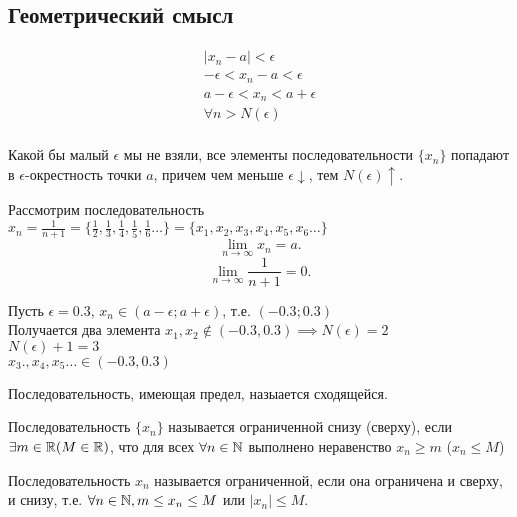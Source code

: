 \subsection{Геометрический смысл}
\begin{align*}
|x_{n} - a| < \epsilon \\
- \epsilon< x_{n} - a < \epsilon \\
a - \epsilon < x_{n} < a + \epsilon \\
\forall n > N(\epsilon) \\
\end{align*}

Какой бы малый $\epsilon$ мы не взяли, все элементы последовательности $\{x_{n}\}$ попадают в $\epsilon$-окрестность точки $a$, причем чем меньше $\epsilon \downarrow$, тем  $N(\epsilon) \uparrow$.

\begin{eg}
  Рассмотрим последовательность $x_{n} = \frac{1}{n+1} = \{ \frac{1}{2}, \frac{1}{3}, \frac{1}{4}, \frac{1}{5}, \frac{1}{6}\ldots \} = \{x_1, x_2, x_3, x_4, x_5, x_6\ldots\} $
  \[
  \lim_{n \to \infty} x_{n} = a
  .\] 
  \[
  \lim_{n \to \infty} \frac{1}{n+1} = 0
  .\] 
\end{eg}
\begin{eg}
  Пусть $\epsilon = 0.3$, $x_{n}\in (a-\epsilon; a+\epsilon)$, т.е. $(-0.3; 0.3)$ \\
  Получается два элемента $x_1, x_2 \not\in (-0.3, 0.3) \implies N(\epsilon) = 2$ \\
  $N(\epsilon) + 1 = 3$ \\
  $x_3., x_4, x_5 \ldots \in (-0.3, 0.3)$ \\
\end{eg}

\begin{definition}
  Последовательность, имеющая предел, назыается сходящейся.
\end{definition}

\begin{definition}
  Последовательность $\{x_{n}\} $ называется ограниченной снизу (сверху), если $\exists m \in \mathbb{R} (M \in \mathbb{R})$, что для всех $\forall n \in \mathbb{N}$ выполнено неравенство $x_{n} \ge m$ ($x_{n} \le M$)
\end{definition}

\begin{definition}
  Последовательность $x_{n}$ называется ограниченной, если она ограничена и сверху, и снизу, т.е. $\forall n \in \mathbb{N}, m \le x_{n} \le M$ или $|x_{n}| \le M$.
\end{definition}

